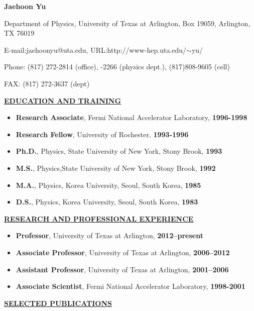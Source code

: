 \begin{center}

{\bf Jaehoon Yu}

Department of Physics, University of Texas at Arlington, Box 19059, Arlington, TX 76019

E-mail:jaehoonyu@uta.edu, URL:http://www-hep.uta.edu/$\sim$yu/

Phone: (817) 272-2814 (office), -2266 (physics dept.), (817)808-9605 (cell)

FAX: (817) 272-3637 (dept)

\end{center}
%
{\underline{\underline{{\bf EDUCATION AND TRAINING}}}}
\begin{itemize}[noitemsep]
\item {\bf Research Associate}{, Fermi National Accelerator Laboratory,} {\bf 1996-1998}
\item {\bf Research Fellow}{, University of Rochester,} {\bf 1993-1996}
\item {\bf Ph.D.}{, Physics, State University of New York, Stony Brook, } {\bf 1993}
\item {\bf M.S.}{, Physics,State University of New York, Stony Brook, } {\bf 1992}
\item {\bf M.A.}{, Physics, Korea University, Seoul, South Korea,} {\bf 1985}
\item {\bf D.S.}{, Physics, Korea University, Seoul, South Korea,} {\bf 1983}
\end{itemize}
%
{\underline{\underline{{\bf RESEARCH AND PROFESSIONAL EXPERIENCE}}}}
\begin{itemize}[noitemsep]
\item {\bf Professor}{, University of Texas at Arlington, } {\bf 2012--present}
\item {\bf Associate Professor}{, University of Texas at Arlington, } {\bf 2006--2012}
\item {\bf Assistant Professor}{, University of Texas at Arlington, } {\bf 2001--2006}
\item {\bf Associate Scientist}{, Fermi National Accelerator Laboratory, }{\bf 1998-2001}
\end{itemize}
%
{\underline{\underline{{\bf SELECTED PUBLICATIONS}}}}
